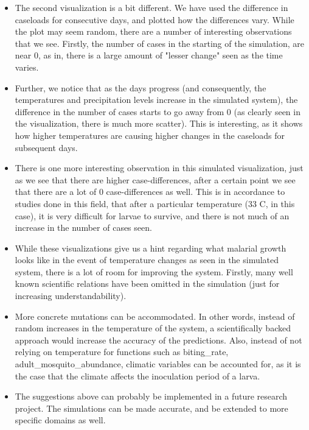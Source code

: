 \documentclass[fontsize=11pt]{article}
\begin{document}
\begin{itemize}
        \item The second visualization is a bit different. We have used the difference in caseloads for consecutive days, and plotted how the differences vary. While the plot may seem random, there are a number of interesting observations that we see. Firstly, the number of cases in the starting of the simulation, are near 0, as in, there is a large amount of "lesser change" seen as the time varies.

        \item Further, we notice that as the days progress (and consequently, the temperatures and precipitation levels increase in the simulated system), the difference in the number of cases starts to go away from 0 (as clearly seen in the visualization, there is much more scatter). This is interesting, as it shows how higher temperatures are causing higher changes in the caseloads for subsequent days.

        \item There is one more interesting observation in this simulated visualization, just as we see that there are higher case-differences, after a certain point we see that there are a lot of 0 case-differences as well. This is in accordance to studies done in this field, that after a particular temperature (33 C, in this case), it is very difficult for larvae to survive, and there is not much of an increase in the number of cases seen.

        \item While these visualizations give us a hint regarding what malarial growth looks like in the event of temperature changes as seen in the simulated system, there is a lot of room for improving the system. Firstly, many well known scientific relations have been omitted in the simulation (just for increasing understandability).

        \item More concrete mutations can be accommodated. In other words, instead of random increases in the temperature of the system, a scientifically backed approach would increase the accuracy of the predictions. Also, instead of not relying on temperature for functions such as biting\_rate, adult\_mosquito\_abundance, climatic variables can be accounted for, as it is the case that the climate affects the inoculation period of a larva.

        \item The suggestions above can probably be implemented in a future research project. The simulations can be made accurate, and be extended to more specific domains as well.


    \end{itemize}
\end{document}
